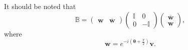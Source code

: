 \documentclass[aps,preprint]{revtex4}
\begin{document}
It should be noted that 
\begin{equation}
\mathbb{B}=\left( 
\begin{array}{cc}
\mathbf{w} & \overline{\mathbf{w}}%
\end{array}%
\right) \left( 
\begin{array}{cc}
\mathbb{I} & 0 \\ 
0 & -\mathbb{I}%
\end{array}%
\right) \left( 
\begin{array}{c}
\overline{\mathbf{w}} \\ 
\mathbf{w}%
\end{array}%
\right) ,
\end{equation}%
where 
\begin{equation}
\mathbf{w}=e^{-i\left( \mathbf{\theta }+\frac{\pi }{2}\right) }\mathbf{v.}
\end{equation}
\end{document}
